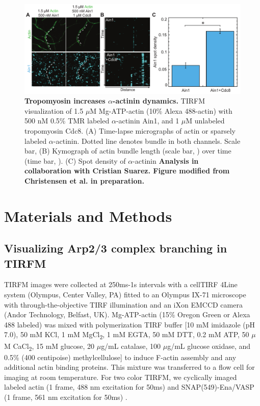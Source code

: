 \begin{figure}
\centering
\includegraphics[width=\textwidth]{img/ch03/Thesis_aact_dynamics.pdf}
\caption[Tropomyosin increases \texorpdfstring{$\alpha$}{alpha}-actinin dynamics.]{\textbf{Tropomyosin increases $\alpha$-actinin dynamics.} TIRFM visualization of 1.5 $\mu$M Mg-ATP-actin (10\% Alexa 488-actin) with 500 nM 0.5\% TMR labeled $\alpha$-actinin Ain1, and 1 $\mu$M unlabeled tropomyosin Cdc8. (A) Time-lapse micrographs of actin or sparsely labeled $\alpha$-actinin. Dotted line denotes bundle in both channels. Scale bar, (B) Kymograph of actin bundle length (scale bar, ) over time (time bar, ). (C) Spot density of $\alpha$-actinin \textbf{Analysis in collaboration with Cristian Suarez. Figure modified from Christensen et al. in preparation.}}
\label{fig:tropo_aact}
\end{figure}


\section{Materials and Methods}\label{bundlers-matmeth}

\subsection{Visualizing Arp2/3 complex branching in TIRFM}
TIRFM images were collected at 250ms-1s intervals with a cellTIRF 4Line system (Olympus, Center Valley, PA) fitted to an Olympus IX-71 microscope with through-the-objective TIRF illumination and an iXon EMCCD camera (Andor Technology, Belfast, UK). Mg-ATP-actin (15\% Oregon Green or Alexa 488 labeled) was mixed with polymerization TIRF buffer [10 mM imidazole (pH 7.0), 50 mM KCl, 1 mM MgCl\textsubscript{2}, 1 mM EGTA, 50 mM DTT, 0.2 mM ATP, 50 $\mu$M CaCl\textsubscript{2}, 15 mM glucose, 20 $\mu$g/mL catalase, 100 $\mu$g/mL glucose oxidase, and 0.5\% (400 centipoise) methylcellulose] to induce F-actin assembly and any additional actin binding proteins. This mixture was transferred to a flow cell for imaging at room temperature. For two color TIRFM, we cyclically imaged labeled actin (1 frame, 488 nm excitation for 50ms) and SNAP(549)-Ena/VASP (1 frame, 561 nm excitation for 50ms) \citep{winkelman_ena/vasp_2014}.
